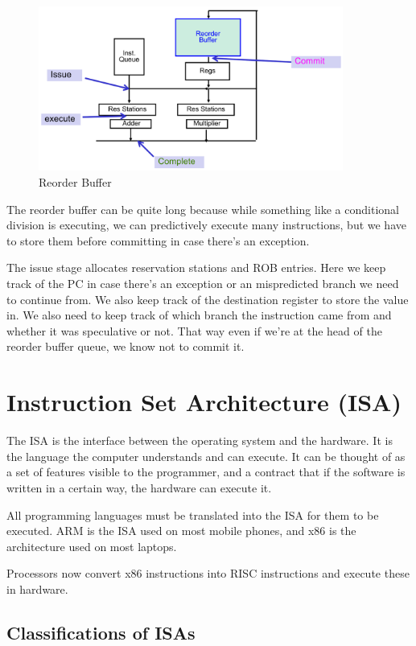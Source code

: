 \documentclass{article}
\begin{document}
\begin{figure}[ht!]
\centering
\includegraphics[width=100mm]{img/ROB.png}
\caption{Reorder Buffer}
\end{figure}

The reorder buffer can be quite long because while something like a conditional division is executing, we can predictively execute many instructions, but we have to store them before committing in case there's an exception. 

The issue stage allocates reservation stations and ROB entries. Here we keep track of the PC in case there's an exception or an mispredicted branch we need to continue from. We also keep track of the destination register to store the value in. We also need to keep track of which branch the instruction came from and whether it was speculative or not. That way even if we're at the head of the reorder buffer queue, we know not to commit it. 




\section{Instruction Set Architecture (ISA)}

The ISA is the interface between the operating system and the hardware. It is the language the computer understands and can execute. It can be thought of as a set of features visible to the programmer, and a contract that if the software is written in a certain way, the hardware can execute it.

All programming languages must be translated into the ISA for them to be executed. ARM is the ISA used on most mobile phones, and x86 is the architecture used on most laptops.

Processors now convert x86 instructions into RISC instructions and execute these in hardware. 

\subsection{Classifications of ISAs}
\end{document}
